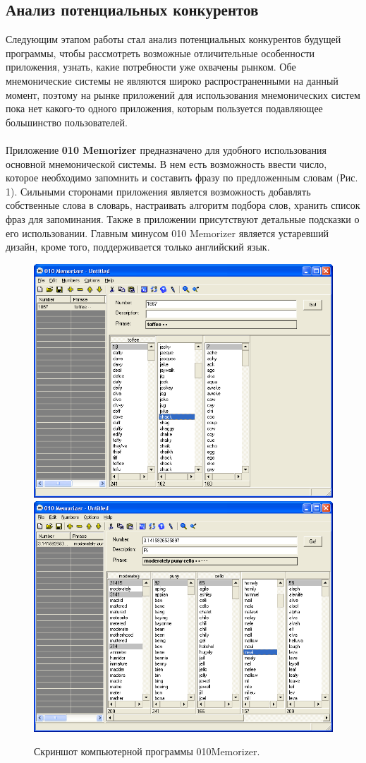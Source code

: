 \documentclass[draft]{article}
\begin{document}
\subsection{Анализ потенциальных конкурентов}
Следующим этапом работы стал анализ потенциальных конкурентов будущей программы, чтобы рассмотреть возможные отличительные особенности приложения, узнать, какие потребности уже охвачены рынком. Обе мнемонические системы не являются широко распространенными на данный момент, поэтому на рынке приложений для использования мнемонических систем пока нет какого-то одного приложения, которым пользуется подавляющее большинство пользователей.\\
~\\
Приложение \textbf{010 Memorizer} \cite{litlink6} предназначено для удобного использования основной мнемонической системы. В нем есть возможность ввести число, которое необходимо запомнить и составить фразу по предложенным словам (Рис. 1). Сильными сторонами приложения является возможность добавлять собственные слова в словарь, настраивать алгоритм подбора слов, хранить список фраз для запоминания. Также в приложении присутствуют детальные подсказки о его использовании. Главным минусом 010 Memorizer является устаревший дизайн, кроме того, поддерживается только английский язык.\\
\begin{center}
\begin{figure}[h]
\includegraphics[draft=false,width=0.5\linewidth]{010Memorizer1}
\includegraphics[draft=false,width=0.51\linewidth]{010Memorizer2}
\caption{Скриншот компьютерной программы 010Memorizer.}
\label{ris:image}
\end{figure}
\end{center}
\end{document}
